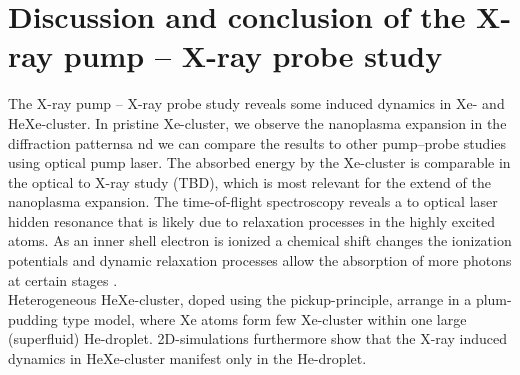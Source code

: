 \section{Discussion and conclusion of the X-ray pump -- X-ray probe study}
The X-ray pump -- X-ray probe study reveals some induced dynamics in Xe- and HeXe-cluster. In pristine Xe-cluster, we observe the nanoplasma expansion in the diffraction patternsa nd we can compare the results to other pump--probe studies using optical pump laser. The absorbed energy by the Xe-cluster is comparable in the optical to X-ray study (TBD), which is most relevant for the extend of the nanoplasma expansion. The time-of-flight spectroscopy reveals a to optical laser hidden resonance that is likely due to relaxation processes in the highly excited atoms. As an inner shell electron is ionized a chemical shift changes the ionization potentials and dynamic relaxation processes allow the absorption of more photons at certain stages \citep{Ho-2014-PRL}.\\
Heterogeneous HeXe-cluster, doped using the pickup-principle, arrange in a plum-pudding type model, where Xe atoms form few Xe-cluster within one large (superfluid) He-droplet. 2D-simulations furthermore show that the X-ray induced dynamics in HeXe-cluster manifest only in the He-droplet.
%
%
%
